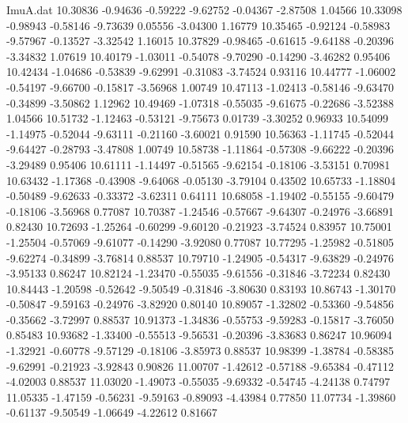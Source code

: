 \begin{filecontents}{ImuA.dat}
  10.30836   -0.94636   -0.59222   -9.62752   -0.04367   -2.87508    1.04566
  10.33098   -0.98943   -0.58146   -9.73639    0.05556   -3.04300    1.16779
  10.35465   -0.92124   -0.58983   -9.57967   -0.13527   -3.32542    1.16015
  10.37829   -0.98465   -0.61615   -9.64188   -0.20396   -3.34832    1.07619
  10.40179   -1.03011   -0.54078   -9.70290   -0.14290   -3.46282    0.95406
  10.42434   -1.04686   -0.53839   -9.62991   -0.31083   -3.74524    0.93116
  10.44777   -1.06002   -0.54197   -9.66700   -0.15817   -3.56968    1.00749
  10.47113   -1.02413   -0.58146   -9.63470   -0.34899   -3.50862    1.12962
  10.49469   -1.07318   -0.55035   -9.61675   -0.22686   -3.52388    1.04566
  10.51732   -1.12463   -0.53121   -9.75673    0.01739   -3.30252    0.96933
  10.54099   -1.14975   -0.52044   -9.63111   -0.21160   -3.60021    0.91590
  10.56363   -1.11745   -0.52044   -9.64427   -0.28793   -3.47808    1.00749
  10.58738   -1.11864   -0.57308   -9.66222   -0.20396   -3.29489    0.95406
  10.61111   -1.14497   -0.51565   -9.62154   -0.18106   -3.53151    0.70981
  10.63432   -1.17368   -0.43908   -9.64068   -0.05130   -3.79104    0.43502
  10.65733   -1.18804   -0.50489   -9.62633   -0.33372   -3.62311    0.64111
  10.68058   -1.19402   -0.55155   -9.60479   -0.18106   -3.56968    0.77087
  10.70387   -1.24546   -0.57667   -9.64307   -0.24976   -3.66891    0.82430
  10.72693   -1.25264   -0.60299   -9.60120   -0.21923   -3.74524    0.83957
  10.75001   -1.25504   -0.57069   -9.61077   -0.14290   -3.92080    0.77087
  10.77295   -1.25982   -0.51805   -9.62274   -0.34899   -3.76814    0.88537
  10.79710   -1.24905   -0.54317   -9.63829   -0.24976   -3.95133    0.86247
  10.82124   -1.23470   -0.55035   -9.61556   -0.31846   -3.72234    0.82430
  10.84443   -1.20598   -0.52642   -9.50549   -0.31846   -3.80630    0.83193
  10.86743   -1.30170   -0.50847   -9.59163   -0.24976   -3.82920    0.80140
  10.89057   -1.32802   -0.53360   -9.54856   -0.35662   -3.72997    0.88537
  10.91373   -1.34836   -0.55753   -9.59283   -0.15817   -3.76050    0.85483
  10.93682   -1.33400   -0.55513   -9.56531   -0.20396   -3.83683    0.86247
  10.96094   -1.32921   -0.60778   -9.57129   -0.18106   -3.85973    0.88537
  10.98399   -1.38784   -0.58385   -9.62991   -0.21923   -3.92843    0.90826
  11.00707   -1.42612   -0.57188   -9.65384   -0.47112   -4.02003    0.88537
  11.03020   -1.49073   -0.55035   -9.69332   -0.54745   -4.24138    0.74797
  11.05335   -1.47159   -0.56231   -9.59163   -0.89093   -4.43984    0.77850
  11.07734   -1.39860   -0.61137   -9.50549   -1.06649   -4.22612    0.81667

\end{filecontents}
